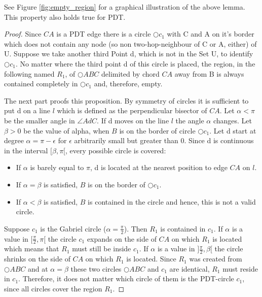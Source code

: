 See Figure \ref{fig:empty_region} for a graphical illustration of the above lemma.
This property also holds true for PDT.

\begin{proof}
Since $CA $ is a PDT edge there is a circle $\bigcirc{c_1} $ with C and A on it's border which does not contain any node (so non two-hop-neighbour of C or A, either) of U.
Suppose we take another third Point d, which is not in the Set U, to identify $\bigcirc{c_1} $.
No matter where the third point d of this circle is placed, the region, in the following named $R_1 $, of $\bigcirc{ABC} $ delimited by chord $CA $ away from B is always contained completely in $\bigcirc{c_1} $ and, therefore, empty.

The next part proofs this proposition.
By symmetry of circles it is sufficient to put d on a line  $l $ which is defined as the perpendicular bisector of $CA $.
Let $\alpha<\pi $ be the smaller angle in $\angle{AdC} $.
If d moves on the line $l $ the angle $\alpha $ changes.   
Let $\beta >0$ be the value of alpha, when $B $ is on the border of circle $\bigcirc{c_1} $.
Let d start at degree $\alpha = \pi-\epsilon $ for $\epsilon $  arbitrarily small but greater than $0 $.
Since d is continuous in the interval $[\beta,\pi[ $, every possible circle is covered:
\begin{itemize}
\item If $\alpha $ is barely equal to $\pi $, d is located at the nearest position to edge $CA $ on $l $.
\item If $\alpha=\beta $ is satisfied, $B $ is on the border of $\bigcirc{c_1} $.
\item If $\alpha <\beta $ is satisfied, $B $ is contained in the circle and hence, this is not a valid circle.
\end{itemize}
Suppose $c_1 $ is the Gabriel circle ($\alpha=\frac{\pi}{2} $).
Then $R_1 $ is contained in $c_1 $. 
If $\alpha $ is a value in $[\frac{\pi}{2},\pi[ $ the circle $c_1 $ expands on the side of $CA $ on which $R_1 $ is located which means that $R_1 $ must still be inside $c_1 $.
If $\alpha $ is a value in $]\frac{\pi}{2},\beta[ $ the circle shrinks on the side of $CA $ on which $R_1 $ is located.
Since $R_1 $ was created from $\bigcirc{ABC} $ and at $\alpha=\beta $ these two circles $\bigcirc{ABC} $ and $c_1 $ are identical, $R_1 $ must reside in $c_1 $.    
Therefore, it does not matter which circle of them is the PDT-circle $c_1 $, since all circles cover the region $R_1 $.

\end{proof} 



